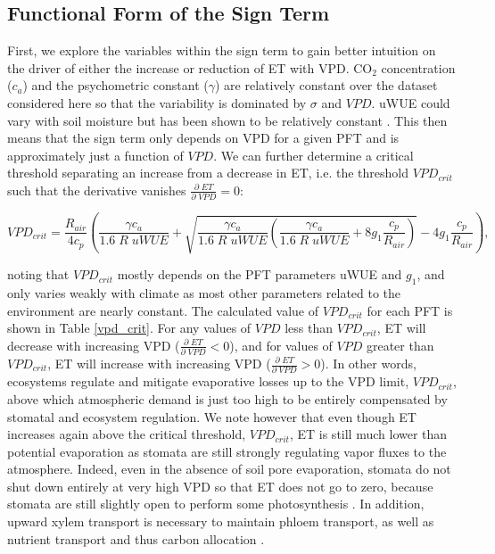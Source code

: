 \documentclass[draft,linenumbers]{afmjournal}
\begin{document}
\subsection{Functional Form of the Sign Term}
\label{sign_term}
First, we explore the variables within the sign term to gain better
intuition on the driver of either the increase or reduction of ET with
VPD. CO$_2$ concentration ($c_a$) and the psychometric constant
($\gamma$) are relatively constant over the dataset considered here so
that the variability is dominated by $\sigma$ and $VPD$. uWUE could
vary with soil moisture but has been shown to be relatively constant
\citep{Zhou_2015}. This then means that the sign term only depends on
VPD for a given PFT and is approximately just a function of $VPD$. We
can further determine a critical threshold separating an increase from
a decrease in ET, i.e. the threshold $VPD_{crit}$ such that the
derivative vanishes $\frac{\partial \; ET}{\partial \; VPD} = 0$:
\small
\begin{linenomath*}
  \begin{equation}
    VPD_{crit} = \frac{R_{air}}{4 c_p} \left( \frac{\gamma c_a}{1.6\; R \;  uWUE} + \sqrt{\frac{\gamma c_a}{1.6\; R \;  uWUE}\left( \frac{\gamma c_a}{1.6\; R \;  uWUE} + 8 g_1 \frac{c_p}{R_{air}}\right)} - 4 g_1 \frac{c_p}{R_{air}} \right),
    \label{vpd_min_et}
  \end{equation}
\end{linenomath*}
\normalsize noting that $VPD_{crit}$ mostly depends on the PFT
parameters uWUE and $g_1$, and only varies weakly with climate as most
other parameters related to the environment are nearly constant. The
calculated value of $VPD_{crit}$ for each PFT is shown in Table
\ref{vpd_crit}. For any values of $VPD$ less than $VPD_{crit}$, ET
will decrease with increasing VPD
($\frac{\partial \; ET}{\partial \; VPD} < 0$), and for values of
$VPD$ greater than $VPD_{crit}$, ET will increase with increasing VPD
($\frac{\partial \; ET}{\partial \; VPD} > 0$). In other words,
ecosystems regulate and mitigate evaporative losses up to the VPD
limit, $VPD_{crit}$, above which atmospheric demand is just too high
to be entirely compensated by stomatal and ecosystem regulation. We
note however that even though ET increases again above the critical
threshold, $VPD_{crit}$, ET is still much lower than potential
evaporation as stomata are still strongly regulating vapor fluxes to
the atmosphere. Indeed, even in the absence of soil pore evaporation,
stomata do not shut down entirely at very high VPD so that ET does not
go to zero, because stomata are still slightly open to perform some
photosynthesis \citep{Ball_1987, Leuning_1990, MEDLYN_2011}. In
addition, upward xylem transport is necessary to maintain phloem
transport, as well as nutrient transport and thus carbon allocation
\citep{De_2013, Nikinmaa_2013, Ryan_2014}.
\end{document}
